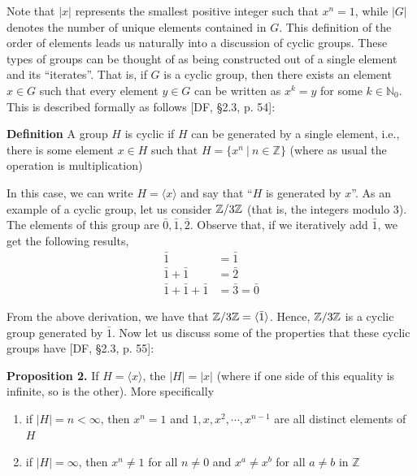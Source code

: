 \documentclass[11pt, reqno]{amsart}
\theoremstyle{plain}
\theoremstyle{definition}
\theoremstyle{example}
\begin{document}
\par
Note that $|x|$ represents the smallest positive integer such that $x^n = 1$, while $|G|$ denotes the number of unique elements contained in $G$. This definition of the order of elements leads us naturally into a discussion of cyclic groups. These types of groups can be thought of as being constructed out of a single element and its ``iterates''. That is, if $G$ is a cyclic group, then there exists an element $x \in G$ such that every element $y \in G$ can be written as $x^k = y$ for some $k \in \mathbb{N}_0$. This is described formally as follows [DF, \S 2.3, p. 54]:

\par
\textbf{Definition} A group $H$ is cyclic if $H$ can be generated by a single element, i.e., there is some element $x \in H$ such that $H = \{x^n \ | \ n \in \mathbb{Z}\}$ (where as usual the operation is multiplication)

\par
In this case, we can write $H = \langle x \rangle$ and say that ``$H$ is generated by $x$''. As an example of a cyclic group, let us consider $\mathbb{Z}/3\mathbb{Z}$ (that is, the integers modulo $3$). The elements of this group are $\bar{0}, \bar{1}, \bar{2}$. Observe that, if we iteratively add $\bar{1}$, we get the following results,
\begin{align*}
\bar{1} &= \bar{1}\\
\bar{1} + \bar{1} &= \bar{2}\\
\bar{1} + \bar{1} + \bar{1} &= \bar{3} = \bar{0}
\end{align*}

\par
From the above derivation, we have that $\mathbb{Z}/3\mathbb{Z} = \langle \bar{1} \rangle$. Hence, $\mathbb{Z}/3\mathbb{Z}$ is a cyclic group generated by $\bar{1}$. Now let us discuss some of the properties that these cyclic groups have [DF, \S 2.3, p. 55]:

\par
\textbf{Proposition 2.} If $H = \langle x \rangle$, the $|H| = |x|$ (where if one side of this equality is infinite, so is the other). More specifically
\begin{enumerate}
\item if $|H| = n < \infty$, then $x^n = 1$ and $1, x, x^2, \cdots, x^{n-1}$ are all distinct elements of $H$

\item if $|H| = \infty$, then $x^n \neq 1$ for all $n \neq 0$ and $x^a \neq x^b$ for all $a \neq b$ in $\mathbb{Z}$

\end{enumerate}
\end{document}
